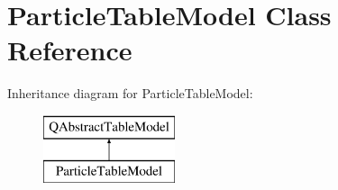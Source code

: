 \hypertarget{class_particle_table_model}{}\section{Particle\+Table\+Model Class Reference}
\label{class_particle_table_model}
Inheritance diagram for Particle\+Table\+Model\+:\begin{figure}[H]
\begin{center}
\leavevmode
\includegraphics[height=2.000000cm]{class_particle_table_model}
\end{center}
\end{figure}
